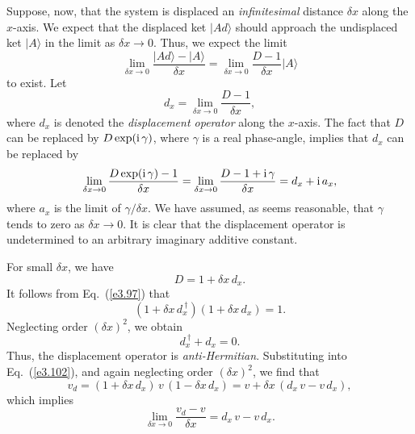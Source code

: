 Suppose, now, that the system is displaced an {\em infinitesimal} distance $\delta x$
along the $x$-axis. We expect that the displaced ket $|A d\rangle$ should
approach the undisplaced ket 
$|A\rangle$ in the limit as $\delta x\rightarrow 0$. Thus,
we expect the limit
\begin{equation}
\lim_{\delta x\rightarrow 0 } \frac{|A d\rangle - |A\rangle}{\delta x}
= \lim_{\delta x\rightarrow 0 }\frac{D-1}{\delta x}|A\rangle
\end{equation}
to exist. Let
\begin{equation}
d_x =  \lim_{\delta x\rightarrow 0 }\frac{D-1}{\delta x},
\end{equation}
where $d_x$ is denoted the {\em displacement operator} along the $x$-axis. The fact 
that $D$ can be replaced by $D \exp({\rm i}\,\gamma)$, where $\gamma$ is a real
phase-angle, implies that $d_x$ can be replaced by
\begin{equation}
 \lim_{\delta x\rightarrow 0 }\frac{D\exp({\rm i}\,\gamma)-1}{\delta x}=
 \lim_{\delta x\rightarrow 0 }\frac{D-1+{\rm i}\, \gamma}{\delta x}= d_x + {\rm i}\,a_x,
\end{equation}
where $a_x$ is the limit of $\gamma/\delta x$. We have assumed, as seems
reasonable,  that $\gamma$ tends
to zero as $\delta x\rightarrow 0$. It is clear that the displacement operator
is undetermined to an arbitrary imaginary additive constant. 

For small $\delta x$, we have
\begin{equation}\label{e3.106}
D = 1 + \delta x\,d_x.
\end{equation}
It follows from Eq.~(\ref{e3.97}) that
\begin{equation}
(1+ \delta x\,d_x^{~\dag}) (1+  \delta x\,d_x) = 1.
\end{equation}
Neglecting order $(\delta x)^2$, we obtain
\begin{equation}
d_x^{~\dag} + d_x = 0.
\end{equation}
Thus, the displacement operator is {\em anti-Hermitian}. Substituting into
Eq.~(\ref{e3.102}), and again neglecting order $(\delta x)^2$, we find that
\begin{equation}
v_d = (1+ \delta x\,d_x)\, v\, (1- \delta x\,d_x) = v + \delta x\,( d_x\, v - v\, d_x),
\end{equation}
which implies
\begin{equation}\label{e3.110}
\lim_{\delta x\rightarrow 0} \frac{v_d -v}{\delta x} = d_x \,v -v\, d_x.
\end{equation}

